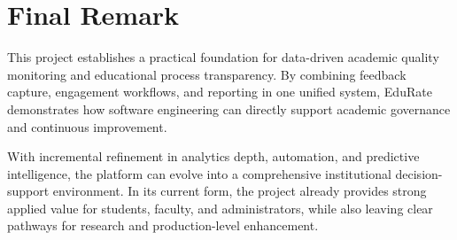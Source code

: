 \section{Final Remark}
This project establishes a practical foundation for data-driven academic quality monitoring and educational process transparency. By combining feedback capture, engagement workflows, and reporting in one unified system, EduRate demonstrates how software engineering can directly support academic governance and continuous improvement.

With incremental refinement in analytics depth, automation, and predictive intelligence, the platform can evolve into a comprehensive institutional decision-support environment. In its current form, the project already provides strong applied value for students, faculty, and administrators, while also leaving clear pathways for research and production-level enhancement.
